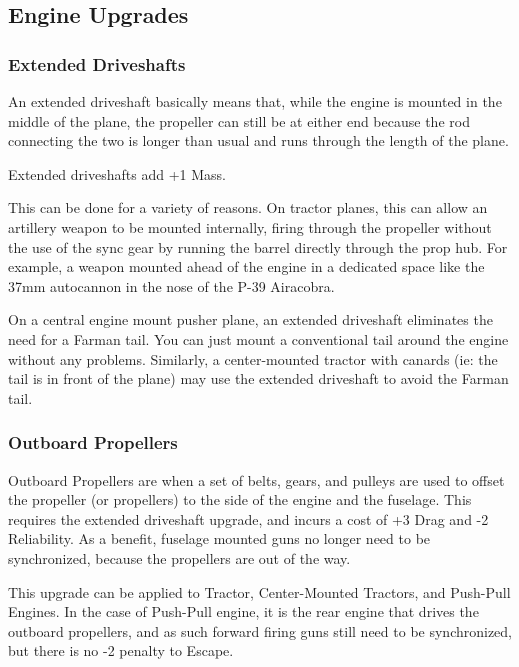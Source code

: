 \documentclass{article}
\begin{document}
\subsection{Engine Upgrades}
\label{_Engine_Upgrades}

\subsubsection{Extended Driveshafts}
\label{_Extended Driveshafts}

An extended driveshaft basically means that, while the engine is mounted
in the middle of the plane, the propeller can still be at either end
because the rod connecting the two is longer than usual and runs through
the length of the plane.

Extended driveshafts add +1 Mass.

This can be done for a variety of reasons. On tractor planes, this can
allow an artillery weapon to be mounted internally, firing through the
propeller without the use of the sync gear by running the barrel
directly through the prop hub. For example, a weapon mounted ahead of
the engine in a dedicated space like the 37mm autocannon in the nose of
the P-39 Airacobra.

On a central engine mount pusher plane, an extended driveshaft
eliminates the need for a Farman tail. You can just mount a conventional
tail around the engine without any problems. Similarly, a center-mounted
tractor with canards (ie: the tail is in front of the plane) may use the
extended driveshaft to avoid the Farman tail.

\subsubsection{Outboard Propellers}
\label{_Outboard Propellers}

Outboard Propellers are when a set of belts, gears, and pulleys are used
to offset the propeller (or propellers) to the side of the engine and
the fuselage. This requires the extended driveshaft upgrade, and incurs
a cost of +3 Drag and -2 Reliability. As a benefit, fuselage mounted
guns no longer need to be synchronized, because the propellers are out
of the way.

This upgrade can be applied to Tractor, Center-Mounted Tractors, and
Push-Pull Engines. In the case of Push-Pull engine, it is the rear
engine that drives the outboard propellers, and as such forward firing
guns still need to be synchronized, but there is no -2 penalty to
Escape.
\end{document}
